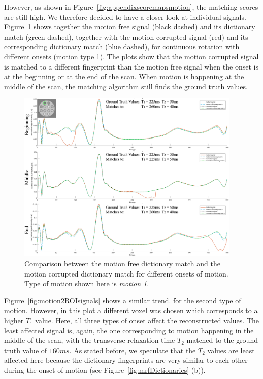 However, as shown in Figure~\ref{fig:appendixscoremapsmotion}, the matching scores are still high. 
We therefore decided to have a closer look at individual signals. 
Figure~\ref{fig:motion1ROIsignals} shows together the motion free signal (black dashed) and its dictionary match (green dashed), together with the motion corrupted signal (red) and its corresponding dictionary match (blue dashed), for continuous rotation with different onsets (motion type 1).
The plots show that the motion corrupted signal is matched to a different fingerprint than the motion free signal when the onset is at the beginning or at the end of the scan.
When motion is happening at the middle of the scan, the matching algorithm still finds the ground truth values.

\begin{figure}[ht]
    \centering
    \includegraphics[width=0.95\textwidth]{images/mrf/motion1ROIsignals}
    \caption{Comparison between the motion free dictionary match and the motion corrupted dictionary match for different onsets of motion. Type of motion shown here is \textit{motion 1}.}
    \label{fig:motion1ROIsignals}
\end{figure}

\hfill

Figure~\ref{fig:motion2ROIsignals} shows a similar trend. for the second type of motion.
However, in this plot a different voxel was chosen which corresponds to a higher $T_1$ value.
Here, all three types of onset affect the reconstructed values.
The least affected signal is, again, the one corresponding to motion happening in the middle of the scan, with the transverse relaxation time $T_2$ matched to the ground truth value of $160ms$.
As stated before, we speculate that the $T_2$ values are least affected here because the dictionary fingerprints are very similar to each other during the onset of motion (see  Figure~\ref{fig:mrfDictionaries} (b)).

